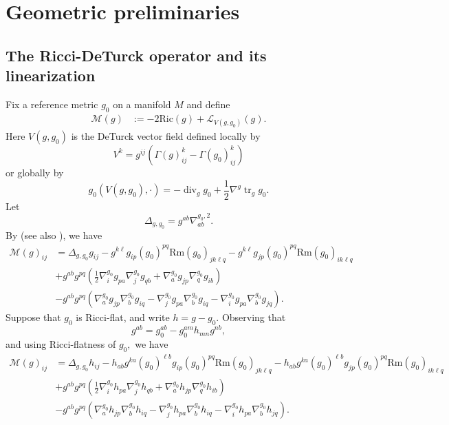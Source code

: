 \documentclass[12pt]{amsart}
\newcommand{\calM}{\mathcal{M}}
\renewcommand{\1}{{\mathbf 1}}
\newcommand{\Rm}{\mathrm{Rm}}
\newcommand{\Ric}{\mathrm{Ric}}
\renewcommand{\div}{{\operatorname{div} }}
\newcommand{\scrL}{{\mathscr L}}
\newcommand{\tr}{{\operatorname{tr}}}
\theoremstyle{others}
\numberwithin{equation}{section}
\begin{document}
\vspace{10mm}



\section{Geometric preliminaries} \label{sec: preliminaries}




\subsection{The Ricci-DeTurck operator and its linearization}\label{ss:riccideturckoperator}

Fix a reference metric $g_0$ on a manifold $M$ and define
\begin{equation}\label{Mdefn}
\begin{split}
     \calM(g) & := -2 \Ric(g) + \scrL_{V(g, g_0)} (g).
    \end{split}
    \end{equation}
Here $V(g, g_0)$ is the DeTurck vector field defined locally by
$$V^k = g^{ij} \left( \Gamma(g)^k_{ij} - \Gamma(g_0)^k_{ij} \right)$$
or globally by
$$g_0(V(g, g_0), \cdot) = - \div_{g} g_0 + \frac12 \nabla^{g} \tr_{g} g_0.$$
Let
$$\Delta_{g,g_0} = g^{ab} \nabla^{g_0,2}_{ab}.$$
By \cite[Lemma 2.1]{Shi89} (see also \cite[p.\ 5]{DeruelleKroncke20}),
we have
\begin{equation}\label{RHSofRdT}
\begin{split}
    \calM(g)_{ij} & = \Delta_{g,g_0} g_{ij} - g^{k\ell} g_{ip} (g_0)^{pq} \Rm(g_0)_{jk\ell q} - g^{k \ell} g_{jp} (g_0)^{pq} \Rm(g_0)_{ik\ell q} \\
   & + g^{ab} g^{pq} \left( \frac12 \nabla^{g_0}_i g_{pa} \nabla^{g_0}_j g_{qb} + \nabla^{g_0}_a g_{jp} \nabla^{g_0}_q g_{ib} \right) \\
   & - g^{ab} g^{pq} \left( \nabla^{g_0}_a g_{jp} \nabla^{g_0}_b g_{iq} - \nabla^{g_0}_j g_{pa} \nabla^{g_0}_b g_{iq} - \nabla^{g_0}_i g_{pa} \nabla^{g_0}_b g_{jq} \right).
    \end{split}
\end{equation}
Suppose that $g_0$ is Ricci-flat, and write $h = g - g_0.$ Observing that 
\begin{equation}\label{g0inversegrelation}
    g^{ab} = g_0^{ab} - g_0^{am} h_{mn} g^{nb},
    \end{equation}
    and using Ricci-flatness of $g_0,$ we have 
\begin{equation}\label{calMfullexpression}
\begin{split}
    \calM(g)_{ij} & = \Delta_{g,g_0} h_{ij} - h_{ab} g^{ka} (g_0)^{\ell b} g_{ip} (g_0)^{pq} \Rm(g_0)_{jk\ell q} - h_{ab} g^{k a} (g_0)^{\ell b} g_{jp} (g_0)^{pq} \Rm(g_0)_{ik\ell q} \\
   & + g^{ab} g^{pq} \left( \frac12 \nabla^{g_0}_i h_{pa} \nabla^{g_0}_j h_{qb} + \nabla^{g_0}_a h_{jp} \nabla^{g_0}_q h_{ib} \right) \\
   & - g^{ab} g^{pq} \left( \nabla^{g_0}_a h_{jp} \nabla^{g_0}_b h_{iq} - \nabla^{g_0}_j h_{pa} \nabla^{g_0}_b h_{iq} - \nabla^{g_0}_i h_{pa} \nabla^{g_0}_b h_{jq} \right).
    \end{split}
\end{equation}
\end{document}

